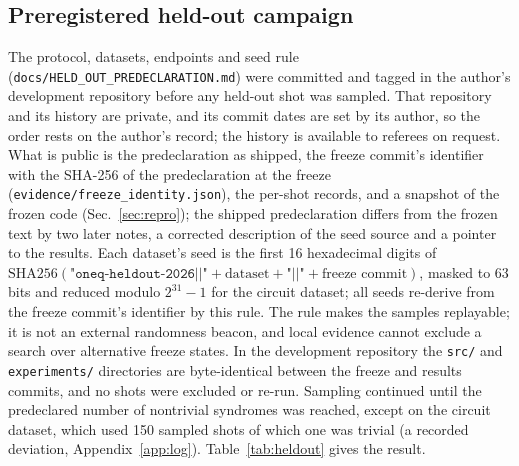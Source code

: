 \documentclass[aps,pra,twocolumn,superscriptaddress,nofootinbib,longbibliography,floatfix]{revtex4-2}
\begin{document}
\subsection{Preregistered held-out campaign}
\label{sec:heldout}

The protocol, datasets, endpoints and seed rule (\nolinkurl{docs/HELD_OUT_PREDECLARATION.md}) were committed and tagged in the author's development repository before any held-out shot was sampled. That repository and its history are private, and its commit dates are set by its author, so the order rests on the author's record; the history is available to referees on request. What is public is the predeclaration as shipped, the freeze commit's identifier with the SHA-256 of the predeclaration at the freeze (\nolinkurl{evidence/freeze_identity.json}), the per-shot records, and a snapshot of the frozen code (Sec.~\ref{sec:repro}); the shipped predeclaration differs from the frozen text by two later notes, a corrected description of the seed source and a pointer to the results. Each dataset's seed is the first 16 hexadecimal digits of $\mathrm{SHA256}(\texttt{"oneq-heldout-2026||"}+\text{dataset}+\texttt{"||"}+\text{freeze commit})$, masked to 63 bits and reduced modulo $2^{31}-1$ for the circuit dataset; all seeds re-derive from the freeze commit's identifier by this rule. The rule makes the samples replayable; it is not an external randomness beacon, and local evidence cannot exclude a search over alternative freeze states. In the development repository the \nolinkurl{src/} and \nolinkurl{experiments/} directories are byte-identical between the freeze and results commits, and no shots were excluded or re-run. Sampling continued until the predeclared number of nontrivial syndromes was reached, except on the circuit dataset, which used 150 sampled shots of which one was trivial (a recorded deviation, Appendix~\ref{app:log}). Table~\ref{tab:heldout} gives the result.

\begin{table}[tbp]
\caption{Preregistered held-out campaign on the [[144,12,12]] code. $N$ counts nontrivial syndromes. Tiers are read from the receipt (Sec.~\ref{sec:ladder}): tier 1 is BP-OSD's own answer proven optimal by one dual, tier 2 a replacement proven optimal by one dual, ``branching'' a tree with at least one branch. The last column is the one-sided exact 95\% Clopper--Pearson lower bound on the certified fraction, floored. Phenomenological datasets use four rounds of noisy syndrome measurement.}
\label{tab:heldout}

\end{table}
\end{document}
